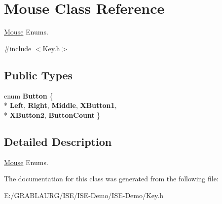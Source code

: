 \hypertarget{class_mouse}{\section{Mouse Class Reference}
\label{class_mouse}
}


\hyperlink{class_mouse}{Mouse} Enums.  




{\ttfamily \#include $<$Key.\-h$>$}

\subsection*{Public Types}
\begin{DoxyCompactItemize}
\item 
enum {\bfseries Button} \{ \\*
{\bfseries Left}, 
{\bfseries Right}, 
{\bfseries Middle}, 
{\bfseries X\-Button1}, 
\\*
{\bfseries X\-Button2}, 
{\bfseries Button\-Count}
 \}
\end{DoxyCompactItemize}


\subsection{Detailed Description}
\hyperlink{class_mouse}{Mouse} Enums. 

The documentation for this class was generated from the following file\-:\begin{DoxyCompactItemize}
\item 
E\-:/\-G\-R\-A\-B\-L\-A\-U\-R\-G/\-I\-S\-E/\-I\-S\-E-\/\-Demo/\-I\-S\-E-\/\-Demo/Key.\-h\end{DoxyCompactItemize}
